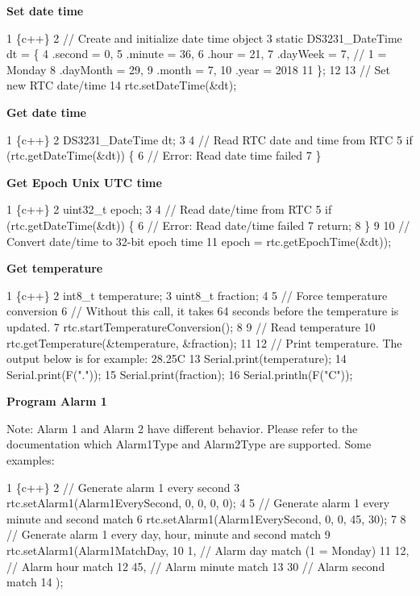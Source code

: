 {\bfseries Set date time}


\begin{DoxyCode}
1 \{c++\}
2 // Create and initialize date time object
3 static DS3231\_DateTime dt = \{
4     .second = 0,
5     .minute = 36,
6     .hour = 21,
7     .dayWeek = 7, // 1 = Monday
8     .dayMonth = 29,
9     .month = 7,
10     .year = 2018
11 \};
12 
13 // Set new RTC date/time
14 rtc.setDateTime(&dt);
\end{DoxyCode}


{\bfseries Get date time}


\begin{DoxyCode}
1 \{c++\}
2 DS3231\_DateTime dt;
3 
4 // Read RTC date and time from RTC
5 if (rtc.getDateTime(&dt)) \{
6     // Error: Read date time failed
7 \}
\end{DoxyCode}


{\bfseries Get Epoch Unix U\+TC time}


\begin{DoxyCode}
1 \{c++\}
2 uint32\_t epoch;
3 
4 // Read date/time from RTC
5 if (rtc.getDateTime(&dt)) \{
6     // Error: Read date/time failed
7     return;
8 \}
9 
10 // Convert date/time to 32-bit epoch time
11 epoch = rtc.getEpochTime(&dt));
\end{DoxyCode}


{\bfseries Get temperature}


\begin{DoxyCode}
1 \{c++\}
2 int8\_t temperature;
3 uint8\_t fraction;
4 
5 // Force temperature conversion
6 // Without this call, it takes 64 seconds before the temperature is updated.
7 rtc.startTemperatureConversion();
8 
9 // Read temperature
10 rtc.getTemperature(&temperature, &fraction);
11 
12 // Print temperature. The output below is for example: 28.25C
13 Serial.print(temperature);
14 Serial.print(F("."));
15 Serial.print(fraction);
16 Serial.println(F("C"));
\end{DoxyCode}


{\bfseries Program Alarm 1}

Note\+: Alarm 1 and Alarm 2 have different behavior. Please refer to the documentation which {\ttfamily Alarm1\+Type} and {\ttfamily Alarm2\+Type} are supported. Some examples\+:


\begin{DoxyCode}
1 \{c++\}
2 // Generate alarm 1 every second
3 rtc.setAlarm1(Alarm1EverySecond, 0, 0, 0, 0);
4 
5 // Generate alarm 1 every minute and second match
6 rtc.setAlarm1(Alarm1EverySecond, 0, 0, 45, 30);
7 
8 // Generate alarm 1 every day, hour, minute and second match
9 rtc.setAlarm1(Alarm1MatchDay, 
10               1,  // Alarm day match (1 = Monday)
11               12, // Alarm hour match
12               45, // Alarm minute match
13               30  // Alarm second match
14 );
\end{DoxyCode}


